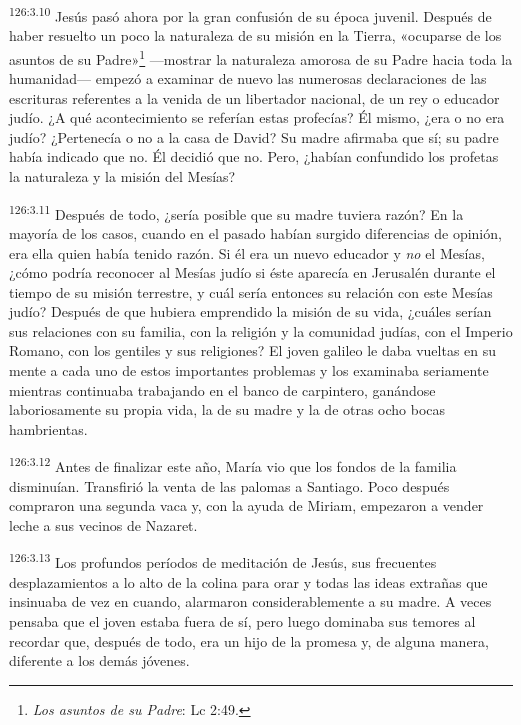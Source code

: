 \par 
\textsuperscript{126:3.10} Jesús pasó ahora por la gran confusión de su época juvenil. Después de haber resuelto un poco la naturaleza de su misión en la Tierra, «ocuparse de los asuntos de su Padre»\footnote{\textit{Los asuntos de su Padre}: Lc 2:49.} ---mostrar la naturaleza amorosa de su Padre hacia toda la humanidad--- empezó a examinar de nuevo las numerosas declaraciones de las escrituras referentes a la venida de un libertador nacional, de un rey o educador judío. ¿A qué acontecimiento se referían estas profecías? Él mismo, ¿era o no era judío? ¿Pertenecía o no a la casa de David? Su madre afirmaba que sí; su padre había indicado que no. Él decidió que no. Pero, ¿habían confundido los profetas la naturaleza y la misión del Mesías?

\par 
\textsuperscript{126:3.11} Después de todo, ¿sería posible que su madre tuviera razón? En la mayoría de los casos, cuando en el pasado habían surgido diferencias de opinión, era ella quien había tenido razón. Si él era un nuevo educador y \textit{no} el Mesías, ¿cómo podría reconocer al Mesías judío si éste aparecía en Jerusalén durante el tiempo de su misión terrestre, y cuál sería entonces su relación con este Mesías judío? Después de que hubiera emprendido la misión de su vida, ¿cuáles serían sus relaciones con su familia, con la religión y la comunidad judías, con el Imperio Romano, con los gentiles y sus religiones? El joven galileo le daba vueltas en su mente a cada uno de estos importantes problemas y los examinaba seriamente mientras continuaba trabajando en el banco de carpintero, ganándose laboriosamente su propia vida, la de su madre y la de otras ocho bocas hambrientas.

\par 
\textsuperscript{126:3.12} Antes de finalizar este año, María vio que los fondos de la familia disminuían. Transfirió la venta de las palomas a Santiago. Poco después compraron una segunda vaca y, con la ayuda de Miriam, empezaron a vender leche a sus vecinos de Nazaret.

\par 
\textsuperscript{126:3.13} Los profundos períodos de meditación de Jesús, sus frecuentes desplazamientos a lo alto de la colina para orar y todas las ideas extrañas que insinuaba de vez en cuando, alarmaron considerablemente a su madre. A veces pensaba que el joven estaba fuera de sí, pero luego dominaba sus temores al recordar que, después de todo, era un hijo de la promesa y, de alguna manera, diferente a los demás jóvenes.

